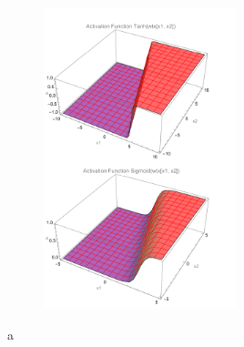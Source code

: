 \documentclass{article}
\begin{document}
\begin{flushleft}
\begin{enumerate}
\begin{figure}[H]
  \includegraphics[width=0.5\textwidth]{1d.png}  %
\end{figure}
\end{enumerate}
a
\end{flushleft}
\end{document}
